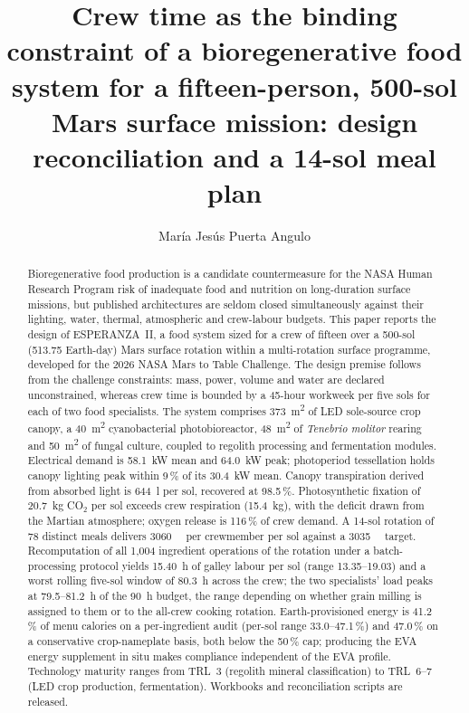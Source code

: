 \documentclass[11pt,a4paper,3p,authoryear]{elsarticle}
\begin{document}
\begin{frontmatter}

\title{Crew time as the binding constraint of a bioregenerative food system for a fifteen-person, 500-sol Mars surface mission: design reconciliation and a 14-sol meal plan}

\author[a]{Mar\'ia Jes\'us Puerta Angulo}
\address[a]{Independent researcher, Tarragona, Spain. ORCID: 0009-0007-8096-5070}

\begin{abstract}
Bioregenerative food production is a candidate countermeasure for the NASA Human Research Program risk of inadequate food and nutrition on long-duration surface missions, but published architectures are seldom closed simultaneously against their lighting, water, thermal, atmospheric and crew-labour budgets. This paper reports the design of ESPERANZA~II, a food system sized for a crew of fifteen over a 500-sol (513.75 Earth-day) Mars surface rotation within a multi-rotation surface programme, developed for the 2026 NASA Mars to Table Challenge. The design premise follows from the challenge constraints: mass, power, volume and water are declared unconstrained, whereas crew time is bounded by a 45-hour workweek per five sols for each of two food specialists. The system comprises \SI{373}{\metre\squared} of LED sole-source crop canopy, a \SI{40}{\metre\squared} cyanobacterial photobioreactor, \SI{48}{\metre\squared} of \emph{Tenebrio molitor} rearing and \SI{50}{\metre\squared} of fungal culture, coupled to regolith processing and fermentation modules. Electrical demand is \SI{58.1}{\kilo\watt} mean and \SI{64.0}{\kilo\watt} peak; photoperiod tessellation holds canopy lighting peak within 9\,\% of its \SI{30.4}{\kilo\watt} mean. Canopy transpiration derived from absorbed light is \SI{644}{\litre} per sol, recovered at 98.5\,\%. Photosynthetic fixation of \SI{20.7}{\kilo\gram} CO$_2$ per sol exceeds crew respiration (\SI{15.4}{\kilo\gram}), with the deficit drawn from the Martian atmosphere; oxygen release is 116\,\% of crew demand. A 14-sol rotation of 78 distinct meals delivers \SI{3060}{\kilo\calorie} per crewmember per sol against a \SI{3035}{\kilo\calorie} target. Recomputation of all 1,004 ingredient operations of the rotation under a batch-processing protocol yields \SI{15.40}{\hour} of galley labour per sol (range 13.35--19.03) and a worst rolling five-sol window of \SI{80.3}{\hour} across the crew; the two specialists' load peaks at 79.5--\SI{81.2}{\hour} of the \SI{90}{\hour} budget, the range depending on whether grain milling is assigned to them or to the all-crew cooking rotation. Earth-provisioned energy is 41.2\,\% of menu calories on a per-ingredient audit (per-sol range 33.0--47.1\,\%) and 47.0\,\% on a conservative crop-nameplate basis, both below the 50\,\% cap; producing the EVA energy supplement in situ makes compliance independent of the EVA profile. Technology maturity ranges from TRL~3 (regolith mineral classification) to TRL~6--7 (LED crop production, fermentation). Workbooks and reconciliation scripts are released.
\end{abstract}


\end{frontmatter}
\end{document}
